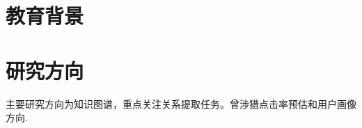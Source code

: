 \documentclass[11pt,a4paper,sans]{moderncv}        %
\begin{document}
\begin{CJK*}{UTF8}{gbsn}                          %
\makecvtitle

\section{教育背景}

\section{研究方向}
主要研究方向为知识图谱，重点关注关系提取任务。曾涉猎点击率预估和用户画像方向.

\end{CJK*}
\end{document}

